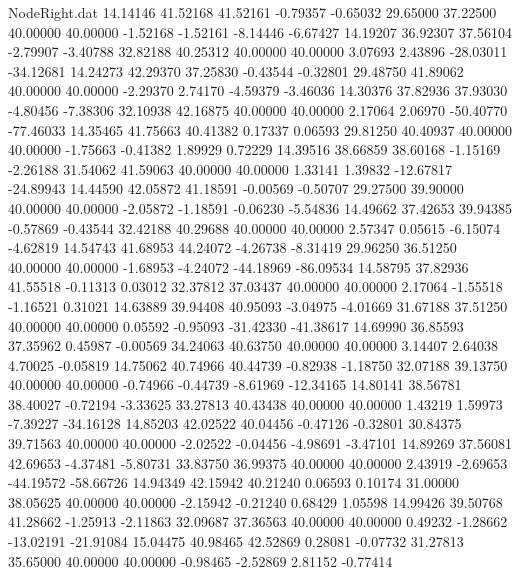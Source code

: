 \begin{filecontents}{NodeRight.dat}
  14.14146   41.52168   41.52161    -0.79357   -0.65032   29.65000   37.22500   40.00000   40.00000   -1.52168   -1.52161   -8.14446   -6.67427
  14.19207   36.92307   37.56104    -2.79907   -3.40788   32.82188   40.25312   40.00000   40.00000    3.07693    2.43896  -28.03011  -34.12681
  14.24273   42.29370   37.25830    -0.43544   -0.32801   29.48750   41.89062   40.00000   40.00000   -2.29370    2.74170   -4.59379   -3.46036
  14.30376   37.82936   37.93030    -4.80456   -7.38306   32.10938   42.16875   40.00000   40.00000    2.17064    2.06970  -50.40770  -77.46033
  14.35465   41.75663   40.41382     0.17337    0.06593   29.81250   40.40937   40.00000   40.00000   -1.75663   -0.41382    1.89929    0.72229
  14.39516   38.66859   38.60168    -1.15169   -2.26188   31.54062   41.59063   40.00000   40.00000    1.33141    1.39832  -12.67817  -24.89943
  14.44590   42.05872   41.18591    -0.00569   -0.50707   29.27500   39.90000   40.00000   40.00000   -2.05872   -1.18591   -0.06230   -5.54836
  14.49662   37.42653   39.94385    -0.57869   -0.43544   32.42188   40.29688   40.00000   40.00000    2.57347    0.05615   -6.15074   -4.62819
  14.54743   41.68953   44.24072    -4.26738   -8.31419   29.96250   36.51250   40.00000   40.00000   -1.68953   -4.24072  -44.18969  -86.09534
  14.58795   37.82936   41.55518    -0.11313    0.03012   32.37812   37.03437   40.00000   40.00000    2.17064   -1.55518   -1.16521    0.31021
  14.63889   39.94408   40.95093    -3.04975   -4.01669   31.67188   37.51250   40.00000   40.00000    0.05592   -0.95093  -31.42330  -41.38617
  14.69990   36.85593   37.35962     0.45987   -0.00569   34.24063   40.63750   40.00000   40.00000    3.14407    2.64038    4.70025   -0.05819
  14.75062   40.74966   40.44739    -0.82938   -1.18750   32.07188   39.13750   40.00000   40.00000   -0.74966   -0.44739   -8.61969  -12.34165
  14.80141   38.56781   38.40027    -0.72194   -3.33625   33.27813   40.43438   40.00000   40.00000    1.43219    1.59973   -7.39227  -34.16128
  14.85203   42.02522   40.04456    -0.47126   -0.32801   30.84375   39.71563   40.00000   40.00000   -2.02522   -0.04456   -4.98691   -3.47101
  14.89269   37.56081   42.69653    -4.37481   -5.80731   33.83750   36.99375   40.00000   40.00000    2.43919   -2.69653  -44.19572  -58.66726
  14.94349   42.15942   40.21240     0.06593    0.10174   31.00000   38.05625   40.00000   40.00000   -2.15942   -0.21240    0.68429    1.05598
  14.99426   39.50768   41.28662    -1.25913   -2.11863   32.09687   37.36563   40.00000   40.00000    0.49232   -1.28662  -13.02191  -21.91084
  15.04475   40.98465   42.52869     0.28081   -0.07732   31.27813   35.65000   40.00000   40.00000   -0.98465   -2.52869    2.81152   -0.77414

\end{filecontents}
